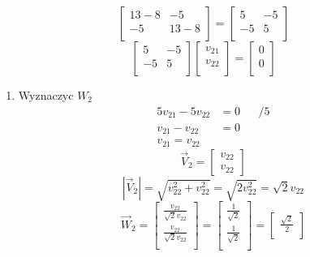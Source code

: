 \documentclass[11pt]{article}
\begin{document}
\begin{enumerate}
\begin{enumerate}
\[\begin{bmatrix}
  13 - 8 & -5\\
  -5 & 13 - 8\\
\end{bmatrix}
=
\begin{bmatrix}
  5 & -5\\
  -5 & 5\\
\end{bmatrix}\]
\[\begin{bmatrix}
    5 & -5\\
    -5 & 5\\
  \end{bmatrix}
  \begin{bmatrix}
    v_{21}\\
    v_{22}\\
  \end{bmatrix} = \begin{bmatrix}
                    0\\
                    0\\
                  \end{bmatrix}\]
\begin{enumerate}
\item Wyznaczyc \(W_{2}\)
\label{sec:org4b60d66}
\begin{align*}
  5 v_{21} - 5 v_{22} &= 0 && / 5\\
  v_{21} - v_{22} &= 0 \\
  v_{21} = v_{22}
\end{align*}
\[\vec V_{2} = \begin{bmatrix}
                 v_{22}\\
                 v_{22}
               \end{bmatrix}\]
\[| \vec V_{2} | = \sqrt{ v_{22}^{2} + v_{22}^{2}}
  = \sqrt{2 v_{22}^{2}}
  = \sqrt{2} v_{22}\]
\[\vec W_2 = \begin{bmatrix}
               \displaystyle\frac{v_{22}}{\sqrt{2} v_{22}}\\
               \displaystyle\frac{v_{22}}{\sqrt{2} v_{22}}\\
             \end{bmatrix}
             = \begin{bmatrix}
                 \frac{1}{\sqrt{2}}\\
                 \frac{1}{\sqrt{2}}\\
               \end{bmatrix}
               = \begin{bmatrix}
                   \frac{\sqrt{2}}{2}\\

\end{bmatrix}\]
\end{enumerate}
\end{enumerate}
\end{enumerate}
\end{document}

